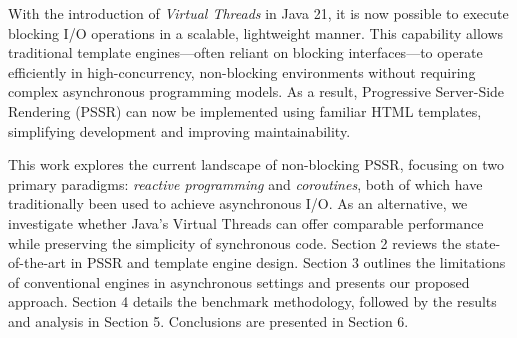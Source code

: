 With the introduction of \textit{Virtual Threads} \cite{oracle-virtual-threads}
in Java 21, it is now possible to execute blocking I/O operations in a
scalable, lightweight manner. This capability allows traditional template
engines—often reliant on blocking interfaces—to operate efficiently in
high-concurrency, non-blocking environments without requiring complex
asynchronous programming models. As a result, Progressive Server-Side Rendering
(PSSR) can now be implemented using familiar HTML templates, 
simplifying development and improving maintainability.

This work explores the current landscape of non-blocking PSSR, focusing on two
primary paradigms: \textit{reactive programming} and \textit{coroutines}, both
of which have traditionally been used to achieve asynchronous I/O. As an
alternative, we investigate whether Java’s Virtual Threads can offer comparable
performance while preserving the simplicity of synchronous code. Section 2
reviews the state-of-the-art in PSSR and template engine design. Section 3
outlines the limitations of conventional engines in asynchronous settings and
presents our proposed approach. Section 4 details the benchmark methodology,
followed by the results and analysis in Section 5. Conclusions are presented in Section 6.